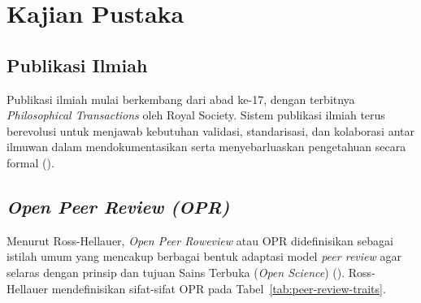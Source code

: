
\chapter{Kajian Pustaka}

\section{Publikasi Ilmiah}

Publikasi ilmiah mulai berkembang dari abad ke-17, dengan terbitnya \textit{Philosophical Transactions} oleh Royal Society. 
Sistem publikasi ilmiah terus berevolusi untuk menjawab kebutuhan validasi, standarisasi, dan kolaborasi antar ilmuwan dalam 
mendokumentasikan serta menyebarluaskan pengetahuan secara formal (\cite{fyfe2022}).

\section{\textit{Open Peer Review (OPR)}}

Menurut Ross-Hellauer, \textit{Open Peer Roweview} atau OPR didefinisikan sebagai istilah umum 
yang mencakup berbagai bentuk adaptasi model \textit{peer review} agar selaras dengan prinsip dan tujuan 
Sains Terbuka (\textit{Open Science}) (\cite{ross2017openpeerreview}). Ross-Hellauer mendefinisikan sifat-sifat 
OPR pada Tabel~\ref{tab:peer-review-traits}.

